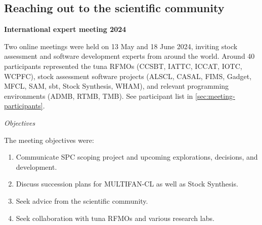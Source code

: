 \documentclass{SCreport}
\begin{document}

\subsection{Reaching out to the scientific community}

\textbf{International expert meeting 2024}

Two online meetings were held on 13 May and 18 June 2024, inviting stock
assessment and software development experts from around the world. Around 40
participants represented the tuna RFMOs (CCSBT, IATTC, ICCAT, IOTC, WCPFC),
stock assessment software projects (ALSCL, CASAL, FIMS, Gadget, MFCL, SAM, sbt,
Stock Synthesis, WHAM), and relevant programming environments (ADMB, RTMB, TMB).
See participant list in \autoref{sec:meeting-participants}.

\textit{Objectives}

The meeting objectives were:

\begin{enumerate}
  \item Communicate SPC scoping project and upcoming explorations, decisions,
  and development.
  \item Discuss succession plans for MULTIFAN-CL as well as Stock Synthesis.
  \item Seek advice from the scientific community.
  \item Seek collaboration with tuna RFMOs and various research labs.
\end{enumerate}
\end{document}
